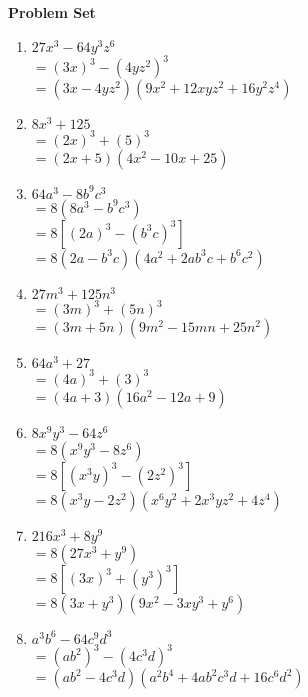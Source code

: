 \textbf{Problem Set}

\vspce


\begin{enumerate} 
%

\item \hspce $27x^{3} - 64y^{3}z^{6}$\\
$= (3 x)^3 - (4 y z^{2})^3$\\
$= \left(3 x - 4 y z^{2}\right) \left(9 x^{2} + 12 x y z^{2} + 16 y^{2} z^{4}\right)$

\item \hspce $8x^{3} + 125$\\
$= (2 x)^3 + (5)^3$\\
$= \left(2 x + 5\right) \left(4 x^{2} - 10 x + 25\right)$

\item \hspce $64a^{3} - 8b^{9}c^{3}$\\
$=8(8a^{3} - b^{9}c^{3}) $\\
$= 8[(2 a)^3 - ( b^{3} c)^3]$\\
$= 8 \left(2 a - b^{3} c\right) \left(4 a^{2} + 2 a b^{3} c + b^{6} c^{2}\right)$

\item \hspce $27m^{3} + 125n^{3}$\\
$= (3 m )^3 + (5 n)^3$\\
$= \left(3 m + 5 n\right) \left(9 m^{2} - 15 m n + 25 n^{2}\right)$

\item \hspce $64a^{3} + 27$\\
$= (4 a)^3 + (3)^3$\\
$= \left(4 a + 3\right) \left(16 a^{2} - 12 a + 9\right)$ 

\item \hspce $8x^{9}y^3 - 64z^{6}$\\
$=8(x^{9}y^3 - 8z^{6}) $\\
$= 8[(x^{3} y)^3 - (2 z^{2})^3]$\\
$= 8 \left(x^{3} y - 2 z^{2}\right) \left(x^{6} y^{2} + 2 x^{3} y z^{2} + 4 z^{4}\right)$

\item \hspce $216x^{3} + 8y^9$\\
$=8(27x^{3} + y^9)$\\
$= 8[(3 x)^3 + (y^{3})^3]$\\
$= 8 \left(3 x + y^{3}\right) \left(9 x^{2} - 3 x y^{3} + y^{6}\right)$

\item \hspce $a^{3}b^6 - 64c^{9}d^{3}$\\
$= (a b^{2})^3 - ( 4 c^{3} d)^3$\\
$= \left(a b^{2} - 4 c^{3} d\right) \left(a^{2} b^{4} + 4 a b^{2} c^{3} d + 16 c^{6} d^{2}\right)$


\end{enumerate}
